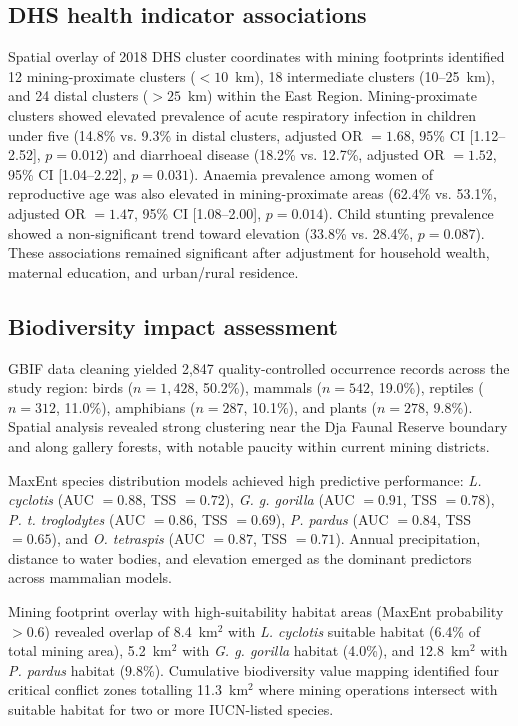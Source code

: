 \documentclass[preprint,12pt,number]{elsarticle}
\begin{document}
\subsection{DHS health indicator associations}

Spatial overlay of 2018 DHS cluster coordinates with mining footprints identified 12 mining-proximate clusters ($< 10$~km), 18 intermediate clusters (10--25~km), and 24 distal clusters ($> 25$~km) within the East Region. Mining-proximate clusters showed elevated prevalence of acute respiratory infection in children under five (14.8\% vs. 9.3\% in distal clusters, adjusted OR $= 1.68$, 95\% CI [1.12--2.52], $p = 0.012$) and diarrhoeal disease (18.2\% vs. 12.7\%, adjusted OR $= 1.52$, 95\% CI [1.04--2.22], $p = 0.031$). Anaemia prevalence among women of reproductive age was also elevated in mining-proximate areas (62.4\% vs. 53.1\%, adjusted OR $= 1.47$, 95\% CI [1.08--2.00], $p = 0.014$). Child stunting prevalence showed a non-significant trend toward elevation (33.8\% vs. 28.4\%, $p = 0.087$). These associations remained significant after adjustment for household wealth, maternal education, and urban/rural residence.


\subsection{Biodiversity impact assessment}

GBIF data cleaning yielded 2,847 quality-controlled occurrence records across the study region: birds ($n = 1,428$, 50.2\%), mammals ($n = 542$, 19.0\%), reptiles ($n = 312$, 11.0\%), amphibians ($n = 287$, 10.1\%), and plants ($n = 278$, 9.8\%). Spatial analysis revealed strong clustering near the Dja Faunal Reserve boundary and along gallery forests, with notable paucity within current mining districts.

MaxEnt species distribution models achieved high predictive performance: \textit{L. cyclotis} (AUC $= 0.88$, TSS $= 0.72$), \textit{G. g. gorilla} (AUC $= 0.91$, TSS $= 0.78$), \textit{P. t. troglodytes} (AUC $= 0.86$, TSS $= 0.69$), \textit{P. pardus} (AUC $= 0.84$, TSS $= 0.65$), and \textit{O. tetraspis} (AUC $= 0.87$, TSS $= 0.71$). Annual precipitation, distance to water bodies, and elevation emerged as the dominant predictors across mammalian models.

Mining footprint overlay with high-suitability habitat areas (MaxEnt probability $> 0.6$) revealed overlap of 8.4~km$^{2}$ with \textit{L. cyclotis} suitable habitat (6.4\% of total mining area), 5.2~km$^{2}$ with \textit{G. g. gorilla} habitat (4.0\%), and 12.8~km$^{2}$ with \textit{P. pardus} habitat (9.8\%). Cumulative biodiversity value mapping identified four critical conflict zones totalling 11.3~km$^{2}$ where mining operations intersect with suitable habitat for two or more IUCN-listed species.
\end{document}
